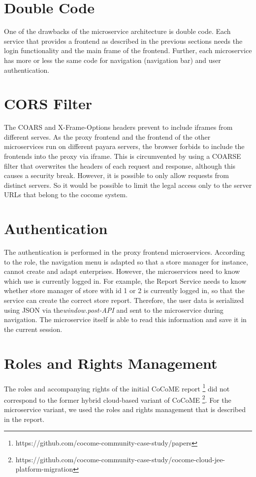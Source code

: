 \section{Double Code}
One of the drawbacks of the microservice architecture is double code. Each service that provides a frontend as described in the previous sections needs the login functionality and the main frame of the frontend. Further, each microservice has more or less the same code for navigation (navigation bar) and user authentication. 

\section{CORS Filter}
The COARS and X-Frame-Options headers prevent to include iframes from different serves. As the proxy frontend and the frontend of the other microservices run on different payara servers, the browser forbids to include the frontends into the proxy via iframe. This is circumvented by using a COARSE filter that overwrites the headers of each request and response, although this causes a security break. However, it is possible to only allow requests from distinct servers. So it would be possible to limit the legal access only to the server URLs that belong to the cocome system.

\section{Authentication}  
The authentication is performed in the proxy frontend microservices. According to the role, the navigation menu is adapted so that a store manager for instance, cannot create and adapt enterprises. However, the microservices need to know which use is currently logged in. For example, the Report Service needs to know whether store manager of store with id 1 or 2 is currently logged in, so that the service can create the correct store report. Therefore, the user data is serialized using JSON via the\textit{window.post-API} and sent to the microservice during navigation. The microservice itself is able to read this information and save it in the current session.

\section{Roles and Rights Management}
The roles and accompanying rights of the initial CoCoME report \footnote{https://github.com/cocome-community-case-study/papers} did not correspond to the former hybrid cloud-based variant of CoCoME \footnote{https://github.com/cocome-community-case-study/cocome-cloud-jee-platform-migration}. For the microservice variant, we used the roles and rights management that is described in the report.

